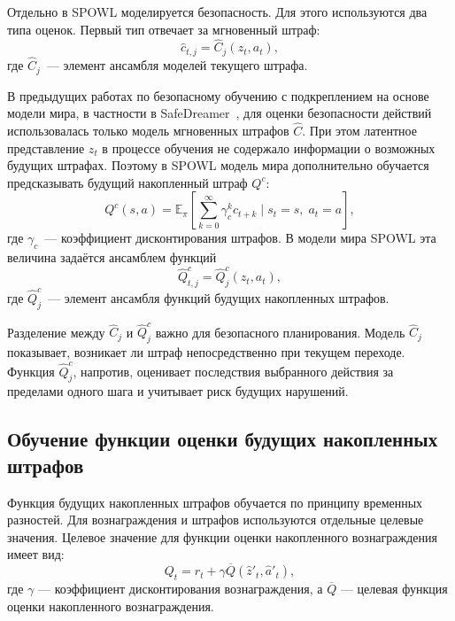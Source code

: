 Отдельно в SPOWL моделируется безопасность. Для этого используются два типа оценок. Первый тип отвечает за мгновенный штраф:
\begin{equation}
    \hat{c}_{t,j} = \hat{C}_j(z_t, a_t),
\end{equation}
где $\hat{C}_j$~--- элемент ансамбля моделей текущего штрафа.

В предыдущих работах по безопасному обучению с подкреплением на основе модели мира, в частности в SafeDreamer~\cite{safedreamer}, для оценки безопасности действий использовалась только модель мгновенных штрафов $\hat{C}$. При этом латентное представление $z_t$ в процессе обучения не содержало информации о возможных будущих штрафах. Поэтому в SPOWL модель мира дополнительно обучается предсказывать будущий накопленный штраф $Q^c$:
\begin{equation}
    Q^c(s,a) =
    \mathbb{E}_\pi\left[
    \sum_{k=0}^{\infty}\gamma_c^k c_{t+k}
    \mid s_t = s,\; a_t = a
    \right],
\end{equation}
где $\gamma_c$~--- коэффициент дисконтирования штрафов. В модели мира SPOWL эта величина задаётся ансамблем функций
\begin{equation}
    \hat{Q}^c_{t,j} = \hat{Q}^c_j(z_t, a_t),
\end{equation}
где $\hat{Q}^c_j$~--- элемент ансамбля функций будущих накопленных штрафов.

Разделение между $\hat{C}_j$ и $\hat{Q}^c_j$ важно для безопасного планирования. Модель $\hat{C}_j$ показывает, возникает ли штраф непосредственно при текущем переходе. Функция $\hat{Q}^c_j$, напротив, оценивает последствия выбранного действия за пределами одного шага и учитывает риск будущих нарушений.

\subsection{Обучение функции оценки будущих накопленных штрафов}
\label{subsec:cost_value_training}

Функция будущих накопленных штрафов обучается по принципу временных разностей. Для вознаграждения и штрафов используются отдельные целевые значения. Целевое значение для функции оценки накопленного вознаграждения имеет вид:
\begin{equation}
    Q_t = r_t + \gamma \overline{Q}(\hat{z}'_t, \hat{a}'_t),
\end{equation}
где $\gamma$ --- коэффициент дисконтирования вознаграждения, а $\overline{Q}$ --- целевая функция оценки накопленного вознаграждения.

